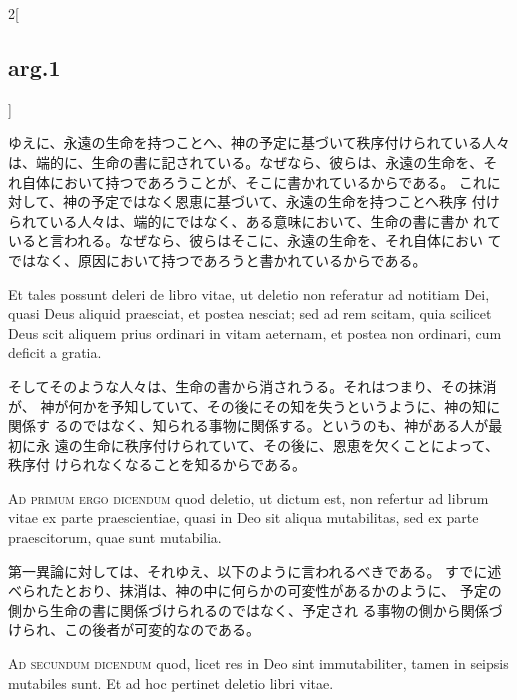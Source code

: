 \documentclass[paper=a4paper,fontsize=10pt,jafontsize=9pt,titlepage]{jlreq}
\begin{document}
\begin{paracol}{2}[\subsection{arg.1}]
\switchcolumn

ゆえに、永遠の生命を持つことへ、神の予定に基づいて秩序付けられている人々
 は、端的に、生命の書に記されている。なぜなら、彼らは、永遠の生命を、そ
 れ自体において持つであろうことが、そこに書かれているからである。
これに対して、神の予定ではなく恩恵に基づいて、永遠の生命を持つことへ秩序
 付けられている人々は、端的にではなく、ある意味において、生命の書に書か
 れていると言われる。なぜなら、彼らはそこに、永遠の生命を、それ自体におい
 てではなく、原因において持つであろうと書かれているからである。

\switchcolumn*

Et tales possunt deleri de libro vitae, ut
deletio non referatur ad notitiam Dei, quasi Deus aliquid praesciat, et
postea nesciat; sed ad rem scitam, quia scilicet Deus scit aliquem prius
ordinari in vitam aeternam, et postea non ordinari, cum deficit a
gratia.

\switchcolumn

そしてそのような人々は、生命の書から消されうる。それはつまり、その抹消が、
神が何かを予知していて、その後にその知を失うというように、神の知に関係す
 るのではなく、知られる事物に関係する。というのも、神がある人が最初に永
 遠の生命に秩序付けられていて、その後に、恩恵を欠くことによって、秩序付
 けられなくなることを知るからである。

\switchcolumn*[\subsection{ad.1}]

{\scshape Ad primum ergo dicendum} quod deletio, ut
dictum est, non refertur ad librum vitae ex parte praescientiae, quasi
in Deo sit aliqua mutabilitas, sed ex parte praescitorum, quae sunt
mutabilia.

\switchcolumn

第一異論に対しては、それゆえ、以下のように言われるべきである。
すでに述べられたとおり、抹消は、神の中に何らかの可変性があるかのように、
 予定の側から生命の書に関係づけられるのではなく、予定され
 る事物の側から関係づけられ、この後者が可変的なのである。

\switchcolumn*[\subsection{ad.2}]

{\scshape Ad secundum dicendum} quod, licet res in Deo
sint immutabiliter, tamen in seipsis mutabiles sunt. Et ad hoc pertinet
deletio libri vitae.


\end{paracol}
\end{document}
